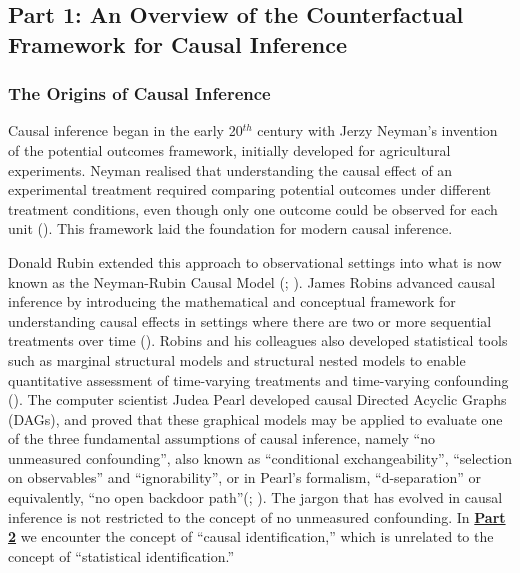 \documentclass[
  singlecolumn]{article}
\begin{document}
\subsection{Part 1: An Overview of the Counterfactual Framework for
Causal Inference}\label{section-part1}

\subsubsection{The Origins of Causal
Inference}\label{the-origins-of-causal-inference}

Causal inference began in the early 20\(^{th}\) century with Jerzy
Neyman's invention of the potential outcomes framework, initially
developed for agricultural experiments. Neyman realised that
understanding the causal effect of an experimental treatment required
comparing potential outcomes under different treatment conditions, even
though only one outcome could be observed for each unit
(). This
framework laid the foundation for modern causal inference.

Donald Rubin extended this approach to observational settings into what
is now known as the Neyman-Rubin Causal Model
(;
). James Robins advanced causal
inference by introducing the mathematical and conceptual framework for
understanding causal effects in settings where there are two or more
sequential treatments over time (). Robins and his colleagues also developed statistical tools such
as marginal structural models and structural nested models to enable
quantitative assessment of time-varying treatments and time-varying
confounding ().
The computer scientist Judea Pearl developed causal Directed Acyclic
Graphs (DAGs), and proved that these graphical models may be applied to
evaluate one of the three fundamental assumptions of causal inference,
namely ``no unmeasured confounding'', also known as ``conditional
exchangeability'', ``selection on observables'' and ``ignorability'', or
in Pearl's formalism, ``d-separation'' or equivalently, ``no open
backdoor path''(;
). The jargon that has
evolved in causal inference is not restricted to the concept of no
unmeasured confounding. In \hyperref[section-part2]{\textbf{Part 2}} we
encounter the concept of ``causal identification,'' which is unrelated
to the concept of ``statistical identification.''
\end{document}
